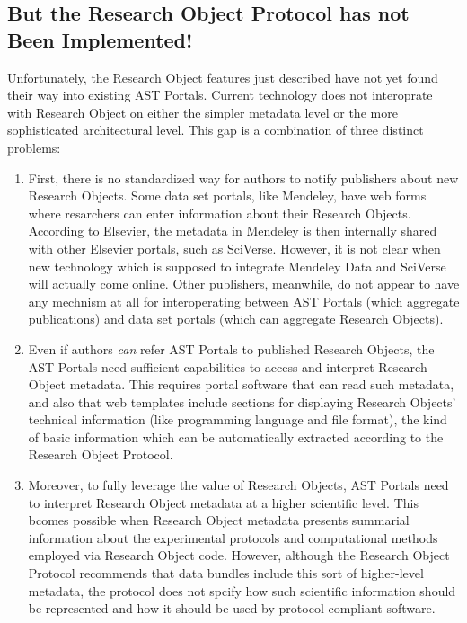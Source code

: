\documentclass[10pt,letterpaper]{article}
\begin{document}
\subsection{But the Research Object Protocol has not Been Implemented!}
Unfortunately, the Research Object features just described 
have not yet found their way into existing AST  
Portals.  Current technology does not 
interoprate with Research Object on either 
the simpler metadata level or the more sophisticated 
architectural level.  This gap is a combination 
of three distinct problems:
\p{}
\begin{enumerate}
\item First, there is no standardized way for authors 
to notify publishers about new Research Objects.  
Some data set portals, like Mendeley, have 
web forms where resarchers can enter information 
about their Research Objects.  According to Elsevier, 
the metadata in Mendeley is then internally shared 
with other Elsevier portals, such as SciVerse.  
However, it is not clear when new technology 
which is supposed to integrate Mendeley Data and 
SciVerse will actually come online.  
Other publishers, meanwhile, do not appear to have 
any mechnism at all for interoperating between 
AST Portals (which aggregate publications) and 
data set portals (which can aggregate Research Objects).

\item Even if authors \textit{can} refer AST Portals 
to published Research Objects, the AST Portals 
need sufficient capabilities to access and 
interpret Research Object metadata.  This 
requires portal software that can read such metadata, 
and also that web templates include sections for 
displaying Research Objects' technical information 
(like programming language and file format), 
the kind of basic information which can be automatically 
extracted according to the Research Object Protocol.

\item Moreover, to fully leverage the value 
of Research Objects, AST Portals need to interpret 
Research Object metadata at a higher scientific level.  
This bcomes possible when Research Object metadata 
presents summarial information about the 
experimental protocols and computational 
methods employed via Research Object code.  
However, although the Research Object Protocol 
recommends that data bundles include 
this sort of higher-level metadata, 
the protocol does not spcify how 
such scientific information should 
be represented and how it should be used 
by protocol-compliant software.  
\end{enumerate} 
 
\end{document}
